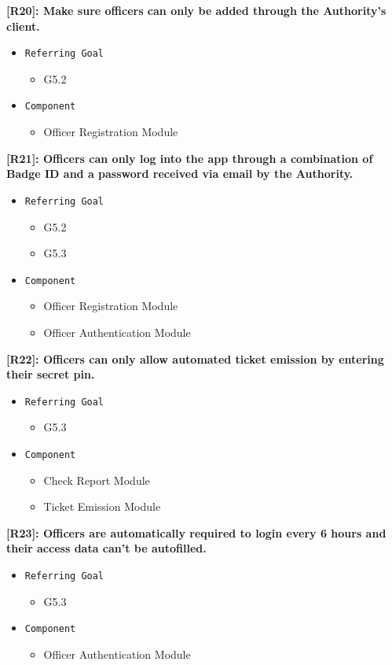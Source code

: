 \documentclass[12pt,a4paper]{article}
\begin{document}
\textbf{[R20]: Make sure officers can only be added through the Authority's client.}
\begin{itemize}
	\item \texttt{Referring Goal}
	\begin{itemize}
		\item G5.2
	\end{itemize}
	\item \texttt{Component}
	\begin{itemize}
		\item Officer Registration Module
	\end{itemize}
\end{itemize}
\textbf{[R21]: Officers can only log into the app through a combination of Badge ID and a password received via email by the Authority.}
\begin{itemize}
	\item \texttt{Referring Goal}
	\begin{itemize}
		\item G5.2
		\item G5.3
	\end{itemize}
	\item \texttt{Component}
	\begin{itemize}
		\item Officer Registration Module
		\item Officer Authentication Module
	\end{itemize}
\end{itemize}
\textbf{[R22]: Officers can only allow automated ticket emission by entering their secret pin.}
\begin{itemize}
	\item \texttt{Referring Goal}
	\begin{itemize}
		\item G5.3
	\end{itemize}
	\item \texttt{Component}
	\begin{itemize}
		\item Check Report Module
		\item Ticket Emission Module	
	\end{itemize}
\end{itemize}
\textbf{[R23]: Officers are automatically required to login every 6 hours and their access data can't be autofilled.}
\begin{itemize}
	\item \texttt{Referring Goal}
	\begin{itemize}
		\item G5.3	
	\end{itemize}
	\item \texttt{Component}
	\begin{itemize}
		\item Officer Authentication Module 
	\end{itemize}
\end{itemize}
\end{document}
